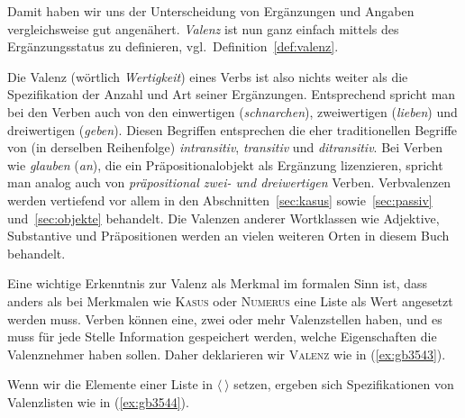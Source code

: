 Damit haben wir uns der Unterscheidung von Ergänzungen und Angaben vergleichsweise gut angenähert.
\textit{Valenz} ist nun ganz einfach mittels des Ergänzungsstatus zu definieren, vgl.\ Definition~\ref{def:valenz}.


Die Valenz (wörtlich \textit{Wertigkeit}) eines Verbs ist also nichts weiter als die Spezifikation der Anzahl und Art seiner Ergänzungen.
Entsprechend spricht man bei den Verben auch von den einwertigen (\textit{schnarchen}), zweiwertigen (\textit{lieben}) und dreiwertigen (\textit{geben}).
Diesen Begriffen entsprechen die eher traditionellen Begriffe von (in derselben Reihenfolge) \textit{intransitiv}, \textit{transitiv} und \textit{ditransitiv}.
Bei Verben wie \textit{glauben} (\textit{an}), die ein Präpositionalobjekt als Ergänzung lizenzieren, spricht man analog auch von \textit{präpositional zwei- und dreiwertigen} Verben.\label{abs:praepditrans}
Verb\-valenzen werden vertiefend vor allem in den Abschnitten~\ref{sec:kasus} sowie~\ref{sec:passiv} und~\ref{sec:objekte} behandelt.
Die Valenzen anderer Wortklassen wie Adjektive, Substantive und Präpositionen werden an vielen weiteren Orten in diesem Buch behandelt.


Eine wichtige Erkenntnis zur Valenz als Merkmal im formalen Sinn ist, dass anders als bei Merkmalen wie \textsc{Kasus} oder \textsc{Numerus} eine Liste als Wert angesetzt werden muss.
Verben können \zB eine, zwei oder mehr Valenzstellen haben, und es muss für jede Stelle Information gespeichert werden, welche Eigenschaften die Valenznehmer haben sollen.
Daher deklarieren wir \textsc{Valenz} wie in (\ref{ex:gb3543}).

\begin{exe}
\end{exe}

Wenn wir die Elemente einer Liste in $\langle\ \rangle$ setzen, ergeben sich Spezifikationen von Valenzlisten wie in (\ref{ex:gb3544}).

\begin{exe}
  \ex\label{ex:gb3544} 
  \begin{xlist}
  \end{xlist}
\end{exe}

